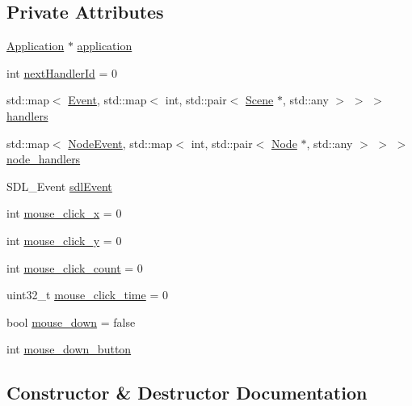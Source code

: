 \subsection*{Private Attributes}
\begin{DoxyCompactItemize}
\item 
\mbox{\hyperlink{classsage_1_1Application}{Application}} $\ast$ \mbox{\hyperlink{classsage_1_1EventDispatcher_a0c9ea12254c6806bd4252e0e336e7c81}{application}}
\item 
int \mbox{\hyperlink{classsage_1_1EventDispatcher_a45a41623356399b6a9afa584762e1897}{next\+Handler\+Id}} = 0
\item 
std\+::map$<$ \mbox{\hyperlink{namespacesage_afe706a25026cc74fe69b56d53a265d29}{Event}}, std\+::map$<$ int, std\+::pair$<$ \mbox{\hyperlink{classsage_1_1Scene}{Scene}} $\ast$, std\+::any $>$ $>$ $>$ \mbox{\hyperlink{classsage_1_1EventDispatcher_a68ed02b0370072fa581e7a9b8b1a68c9}{handlers}}
\item 
std\+::map$<$ \mbox{\hyperlink{namespacesage_ad2c7b0e1ebf67f572d43620e6b07aa13}{Node\+Event}}, std\+::map$<$ int, std\+::pair$<$ \mbox{\hyperlink{classsage_1_1Node}{Node}} $\ast$, std\+::any $>$ $>$ $>$ \mbox{\hyperlink{classsage_1_1EventDispatcher_aefdb6a3e004a7bec95ae6f0845ba8d05}{node\+\_\+handlers}}
\item 
S\+D\+L\+\_\+\+Event \mbox{\hyperlink{classsage_1_1EventDispatcher_acc93b97b0ed92a64ab2e2040dc8ca04c}{sdl\+Event}}
\item 
int \mbox{\hyperlink{classsage_1_1EventDispatcher_a744f0db4a213a5e9d90316f991b10bcf}{mouse\+\_\+click\+\_\+x}} = 0
\item 
int \mbox{\hyperlink{classsage_1_1EventDispatcher_abf2ef4959095c77e28cd363b53d0cab2}{mouse\+\_\+click\+\_\+y}} = 0
\item 
int \mbox{\hyperlink{classsage_1_1EventDispatcher_ab66ab2cbe57fd5a7d04c130a25e042dd}{mouse\+\_\+click\+\_\+count}} = 0
\item 
uint32\+\_\+t \mbox{\hyperlink{classsage_1_1EventDispatcher_ae59ac77950d2ab74ad826220fa147ec7}{mouse\+\_\+click\+\_\+time}} = 0
\item 
bool \mbox{\hyperlink{classsage_1_1EventDispatcher_add0d3b2e04a6b55fb79bb9cee798661c}{mouse\+\_\+down}} = false
\item 
int \mbox{\hyperlink{classsage_1_1EventDispatcher_ab4e7abdcd8cedf5ecf3a662b762cf7a5}{mouse\+\_\+down\+\_\+button}}
\end{DoxyCompactItemize}


\subsection{Constructor \& Destructor Documentation}
\mbox{\label{classsage_1_1EventDispatcher_aa80c440a5ba6379d084f616417ce0958}} 
